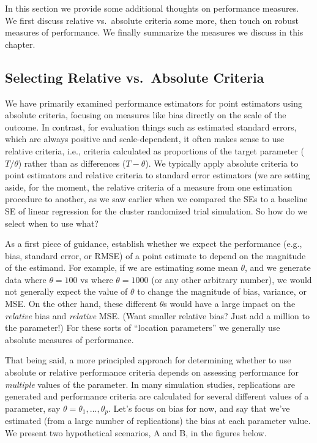 \documentclass[
]{book}
\begin{document}
In this section we provide some additional thoughts on performance measures.
We first discuss relative vs.~absolute criteria some more, then touch on robust measures of performance.
We finally summarize the measures we discuss in this chapter.

\subsection{Selecting Relative vs.~Absolute Criteria}\label{sec-relative-performance}

We have primarily examined performance estimators for point estimators using absolute criteria, focusing on measures like bias directly on the scale of the outcome.
In contrast, for evaluation things such as estimated standard errors, which are always positive and scale-dependent, it often makes sense to use relative criteria, i.e., criteria calculated as proportions of the target parameter (\(T/\theta\)) rather than as differences (\(T - \theta\)).
We typically apply absolute criteria to point estimators and relative criteria to standard error estimators (we are setting aside, for the moment, the relative criteria of a measure from one estimation procedure to another, as we saw earlier when we compared the SEs to a baseline SE of linear regression for the cluster randomized trial simulation.
So how do we select when to use what?

As a first piece of guidance, establish whether we expect the performance (e.g., bias, standard error, or RMSE) of a point estimate to depend on the magnitude of the estimand.
For example, if we are estimating some mean \(\theta\), and we generate data where \(\theta = 100\) vs where \(\theta = 1000\) (or any other arbitrary number), we would not generally expect the value of \(\theta\) to change the magnitude of bias, variance, or MSE.
On the other hand, these different \(\theta\)s would have a large impact on the \emph{relative} bias and \emph{relative} MSE.
(Want smaller relative bias? Just add a million to the parameter!)
For these sorts of ``location parameters'' we generally use absolute measures of performance.

That being said, a more principled approach for determining whether to use absolute or relative performance criteria depends on assessing performance for \emph{multiple} values of the parameter.
In many simulation studies, replications are generated and performance criteria are calculated for several different values of a parameter, say \(\theta = \theta_1,...,\theta_p\).
Let's focus on bias for now, and say that we've estimated (from a large number of replications) the bias at each parameter value.
We present two hypothetical scenarios, A and B, in the figures below.
\end{document}
